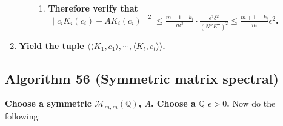 \documentclass[twocolumn]{article}
\begin{document}
\begin{enumerate}
\begin{enumerate}
\begin{enumerate}
					\item \textbf{Therefore verify that $\lVert c_iK_i(c_i)-AK_i(c_i)\rVert^2\le\frac{m+1-k_i}{m^3}\cdot\frac{\epsilon^2\delta^2}{(N''E'')^2}\le\frac{m+1-k_i}{m}\epsilon^2$.}
					\end{enumerate}
				\end{enumerate}
				\item \textbf{Yield the tuple $\langle\langle K_1,c_1\rangle,\cdots,\langle K_t,c_t\rangle\rangle$.}
			\end{enumerate}
		\subsection{Algorithm 56 (Symmetric matrix spectral)}\label{sec:algorithm 56}
			\textbf{Choose a symmetric $\mathcal{M}_{m,m}(\mathbb{Q})$, $A$. Choose a $\mathbb{Q}$ $\epsilon>0$.} Now do the following:
\end{document}
